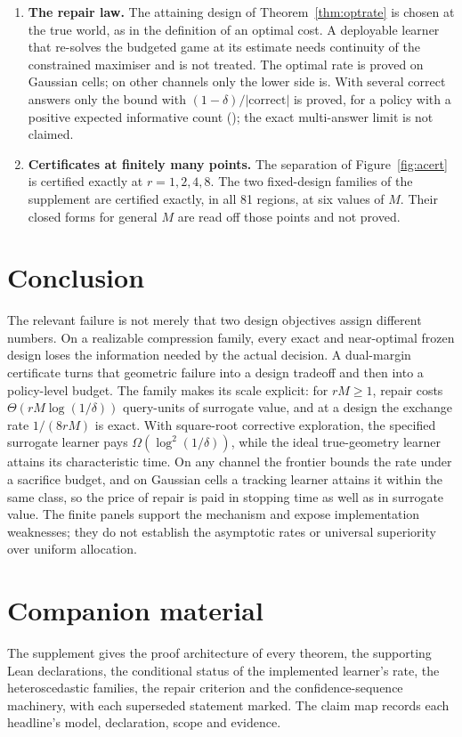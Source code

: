 \begin{enumerate}
to be nondecreasing.
\item[5)] \textbf{The repair law.} The attaining design of Theorem~\ref{thm:optrate} is chosen
at the true world, as in the definition of an optimal cost. A deployable learner that re-solves
the budgeted game at its estimate needs continuity of the constrained maximiser and is not
treated. The optimal rate is proved on Gaussian cells; on other channels only the lower side is.
With several correct answers only the bound with $(1-\delta)/|\text{correct}|$ is proved, for a
policy with a positive expected informative count (); the exact
multi-answer limit is not claimed.
\item[6)] \textbf{Certificates at finitely many points.} The separation of
Figure~\ref{fig:acert} is certified exactly at $r=1,2,4,8$. The two fixed-design families of the
supplement are certified exactly, in all 81 regions, at six values of $M$. Their closed forms for
general $M$ are read off those points and not proved.
\end{enumerate}

\section{Conclusion}

The relevant failure is not merely that two design objectives assign different numbers.
On a realizable compression family, every exact and near-optimal frozen design loses the
information needed by the actual decision. A dual-margin certificate turns that geometric
failure into a design tradeoff and then into a policy-level budget. The family makes its
scale explicit: for $rM\ge1$, repair costs $\Theta(rM\log(1/\delta))$ query-units of surrogate
value, and at a design the exchange rate $1/(8rM)$ is exact. With square-root corrective exploration, the specified surrogate learner pays
$\Omega(\log^2(1/\delta))$, while the ideal true-geometry learner attains its characteristic
time. On any channel the frontier bounds the rate under a sacrifice budget, and on Gaussian
cells a tracking learner attains it within the same class, so the price of repair is paid in
stopping time as well as in surrogate value. The finite panels
support the mechanism and expose implementation weaknesses; they
do not establish the asymptotic rates or universal superiority over uniform allocation.

\section*{Companion material}
The supplement gives the proof architecture of every theorem, the supporting Lean declarations,
the conditional status of the implemented learner's rate, the heteroscedastic families, the
repair criterion and the confidence-sequence machinery, with each superseded statement marked.
The claim map records each headline's model, declaration, scope and evidence.

